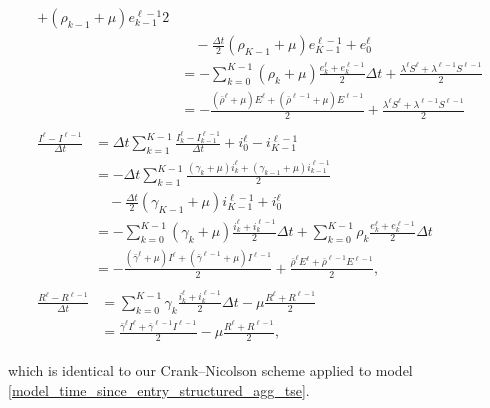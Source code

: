 \documentclass{jpmarticle}
\let\subequationsorig\subequations%
\let\endsubequationsorig\endsubequations%
\renewenvironment{subequations}{
  \subequationsorig
  \renewcommand{\theequation}{\theparentequation.\arabic{equation}}
}{
  \endsubequationsorig
}
\begin{document}
\begin{subequations}
\begin{align}
\begin{split}
{      + (\rho_{k - 1} + \mu) e_{k - 1}^{\ell - 1}}{2}
      \\ & \quad {}
      - \frac{\Delta t}{2} (\rho_{K - 1} + \mu) e_{K - 1}^{\ell - 1}
      + e_0^{\ell}
      \\
      &= - \sum_{k = 0}^{K - 1}
      (\rho_k + \mu) \frac{e_k^{\ell} + e_k^{\ell - 1}}{2}
      \Delta t
      + \frac{\lambda^{\ell} S^{\ell}
        + \lambda^{\ell - 1} S^{\ell - 1}}{2}
      \\
      &= - \frac{(\bar{\rho}^{\ell} + \mu) E^{\ell}
        + (\bar{\rho}^{\ell - 1} + \mu) E^{\ell - 1}}{2}
      + \frac{\lambda^{\ell} S^{\ell}
        + \lambda^{\ell - 1} S^{\ell - 1}}{2}
    \end{split}
    \\
    \begin{split}
      \frac{I^{\ell}  - I^{\ell - 1}}{\Delta t}
      &= \Delta t \sum_{k = 1}^{K - 1}
      \frac{I_k^{\ell} - I_{k - 1}^{\ell - 1}}{\Delta t}
      + i_0^{\ell} - i_{K - 1}^{\ell - 1}
      \\
      &= - \Delta t \sum_{k = 1}^{K - 1}
      \frac{(\gamma_k + \mu) i_k^{\ell}
        + (\gamma_{k - 1} + \mu) i_{k - 1}^{\ell - 1}}{2}
      \\ & \quad {}
      - \frac{\Delta t}{2} (\gamma_{K - 1} + \mu) i_{K - 1}^{\ell - 1}
      + i_0^{\ell}
      \\
      &= - \sum_{k = 0}^{K - 1}
      (\gamma_k + \mu) \frac{i_k^{\ell} + i_k^{\ell - 1}}{2}
      \Delta t
      + \sum_{k = 0}^{K - 1} \rho_k
      \frac{e_k^{\ell} + e_k^{\ell - 1}}{2}
      \Delta t
      \\
      &= - \frac{(\bar{\gamma}^{\ell} + \mu) I^{\ell}
        + (\bar{\gamma}^{\ell - 1} + \mu) I^{\ell - 1}}{2}
      + \frac{\bar{\rho}^{\ell} E^{\ell}
        + \bar{\rho}^{\ell - 1} E^{\ell - 1}}{2},
    \end{split}
    \\
    \begin{split}
      \frac{R^{\ell} - R^{\ell - 1}}{\Delta t}
      &= \sum_{k = 0}^{K - 1} \gamma_k
      \frac{i_k^{\ell} + i_k^{\ell - 1}}{2}
      \Delta t
      - \mu \frac{R^{\ell} + R^{\ell - 1}}{2}
      \\
      &= \frac{\bar{\gamma}^{\ell} I^{\ell}
        + \bar{\gamma}^{\ell - 1} I^{\ell - 1}}{2}
      - \mu \frac{R^{\ell} + R^{\ell - 1}}{2},
    \end{split}
  \end{align}
\end{subequations}
which is identical to our Crank--Nicolson scheme applied to model
\eqref{model_time_since_entry_structured_agg_tse}.
\end{document}

